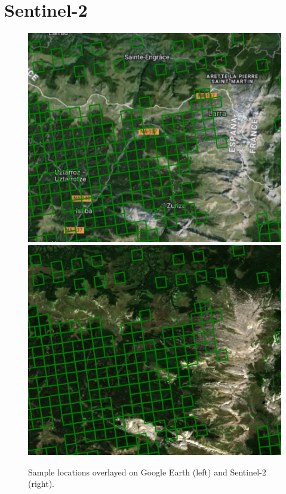 \section{Sentinel-2}

\begin{figure}[!htb]
    \centering

    \includegraphics[width=0.48\linewidth]{figures_labels/sample_area_earth.png}
    \includegraphics[width=0.48\linewidth]{figures_labels/sample_area_sentinel.png}

    \caption{Sample locations overlayed on Google Earth (left) and Sentinel-2 (right).}
    \label{fig:_label_sample_area}
\end{figure}

